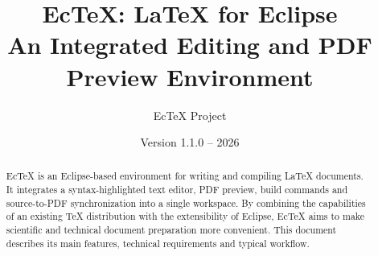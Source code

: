 \documentclass[11pt,a4paper]{article}
\title{\textbf{EcTeX: LaTeX for Eclipse}\\
\large An Integrated Editing and PDF Preview Environment}
\author{EcTeX Project}
\date{Version 1.1.0 -- 2026}
\begin{document}
\maketitle

\begin{abstract}
EcTeX is an Eclipse-based environment for writing and compiling
LaTeX documents. It integrates a syntax-highlighted text editor,
PDF preview, build commands and source-to-PDF synchronization
into a single workspace. By combining the capabilities of an
existing TeX distribution with the extensibility of Eclipse,
EcTeX aims to make scientific and technical document preparation
more convenient. This document describes its main features,
technical requirements and typical workflow.
\end{abstract}

\tableofcontents













\end{document}
